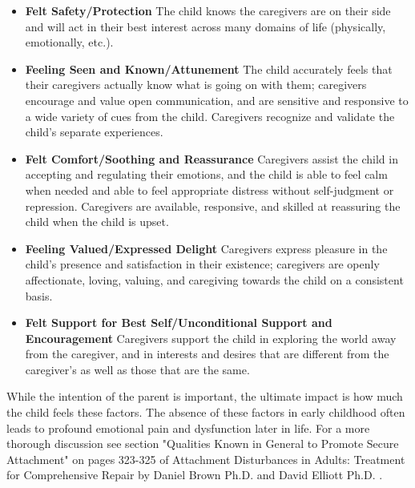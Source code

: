 \documentclass[12pt,letterpaper]{book}
\begin{document}
\begin{itemize}
    \item \textbf{Felt Safety/Protection} The child knows the caregivers are on their side and will act in their best interest across many domains of life (physically, emotionally, etc.).
    \item \textbf{Feeling Seen and Known/Attunement} The child accurately feels that their caregivers actually know what is going on with them; caregivers encourage and value open communication, and are sensitive and responsive to a wide variety of cues from the child. Caregivers recognize and validate the child's separate experiences.
    \item \textbf{Felt Comfort/Soothing and Reassurance} Caregivers assist the child in accepting and regulating their emotions, and the child is able to feel calm when needed and able to feel appropriate distress without self-judgment or repression. Caregivers are available, responsive, and skilled at reassuring the child when the child is upset.
    \item \textbf{Feeling Valued/Expressed Delight} Caregivers express pleasure in the child's presence and satisfaction in their existence; caregivers are openly affectionate, loving, valuing, and caregiving towards the child on a consistent basis.
    \item \textbf{Felt Support for Best Self/Unconditional Support and Encouragement} Caregivers support the child in exploring the world away from the caregiver, and in interests and desires that are different from the caregiver's as well as those that are the same.
\end{itemize}

While the intention of the parent is important, the ultimate impact is how much the child feels these factors. The absence of these factors in early childhood often leads to profound emotional pain and dysfunction later in life. For a more thorough discussion see section "Qualities Known in General to Promote Secure Attachment" on pages 323-325 of Attachment Disturbances in Adults: Treatment for Comprehensive Repair by Daniel Brown Ph.D. and David Elliott Ph.D. \cite{brownAttachmentDisturbances}.
\end{document}
